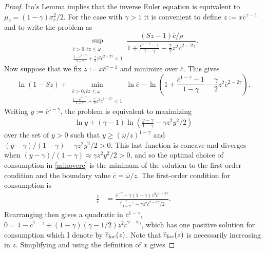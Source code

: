 \documentclass[11pt]{article}
\theoremstyle{plain}
\theoremstyle{definition} %
\begin{document}
\begin{proof}
Ito's Lemma implies that the inverse Euler equation is equivalent to $\mu_c = {\left(1 - \gamma\right)}\sigma_c^2/2$. For the case with $\gamma > 1$ it is convenient to define $z := x\overline{c}^{\gamma-1}$ and to write the problem as 
\begin{equation}
\sup_{\substack{\overline{c} > 0, \overline{c}z \leq \overline{\omega} \\ \frac{1-\overline{c}^{1-\gamma}}{1-\gamma} + \frac{\gamma}{2} z^2 \overline{c}^{2-2\gamma} < 1}} \frac{(Sz - 1) \overline{c}/\rho}{1 + \frac{\overline{c}^{1-\gamma}-1}{1-\gamma} - \frac{\gamma}{2} z^2 \overline{c}^{2-2\gamma}}.
\label{vz}
\end{equation} 
Now suppose that we fix $z := x\overline{c}^{\gamma-1}$ and minimize over $\overline{c}$. This gives
\begin{equation}
\ln (1 - Sz) + \min_{\substack{\overline{c} > 0, \overline{c}z \leq \overline{\omega} \\ \frac{1-\overline{c}^{1-\gamma}}{1-\gamma} + \frac{\gamma}{2} z^2 \overline{c}^{2-2\gamma} < 1}} \ln \overline{c} - \ln {\left(1 + \frac{\overline{c}^{1-\gamma}-1}{1-\gamma} - \frac{\gamma}{2} z^2 \overline{c}^{2-2\gamma} \right)}.
\label{minoverc}
\end{equation}
Writing $y := \overline{c}^{1-\gamma}$, the problem is equivalent to maximizing
\begin{align*}
\ln y + (\gamma - 1) \ln {\left(\frac{y - \gamma}{1 - \gamma} - \gamma z^2y^2/2 \right)}
\end{align*}
over the set of $y > 0$ such that $y \geq (\overline{\omega}/z)^{1-\gamma}$ and $(y - \gamma)/(1 - \gamma) - \gamma z^2y^2/2 > 0$. This last function is concave and diverges when $(y - \gamma)/(1 - \gamma) \approx \gamma z^2y^2/2 > 0$, and so the optimal choice of consumption in \eqref{minoverc} is the minimum of the solution to the first-order condition and the boundary value $\overline{c} = \overline{\omega}/z$. The first-order condition for consumption is
\begin{align*}
\frac{1}{\overline{c}} & = \frac{\overline{c}^{-\gamma} - \gamma(1 - \gamma) z^2\overline{c}^{1 - 2\gamma}}{\frac{\overline{c}^{1-\gamma} - \gamma}{1 - \gamma} - \gamma z^2\overline{c}^{2 - 2\gamma}/2}.
\end{align*}
Rearranging then gives a quadratic in $\overline{c}^{1-\gamma}$, $0 = 1 - \overline{c}^{1-\gamma} + (1-\gamma)(\gamma-1/2) z^2\overline{c}^{2-2\gamma}$, which has one positive solution for consumption which I denote by $\overline{c}_{\textnormal{foc}}(z)$. Note that $\overline{c}_{\textnormal{foc}}(z)$ is necessarily increasing in $z$. Simplifying and using the definition of $x$ gives

\end{proof}
\end{document}
